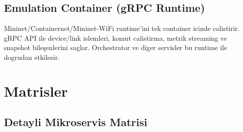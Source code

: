 \documentclass[conference]{IEEEtran}
\begin{document}
\subsection{Emulation Container (gRPC Runtime)}
Mininet/Containernet/Mininet-WiFi runtime’ini tek container icinde calistirir. gRPC API ile device/link islemleri, komut calistirma, metrik streaming ve snapshot bileşenlerini saglar. Orchestrator ve diger servisler bu runtime ile dogrudan etkilesir.

\section{Matrisler}
\subsection{Detayli Mikroservis Matrisi}
\end{document}
